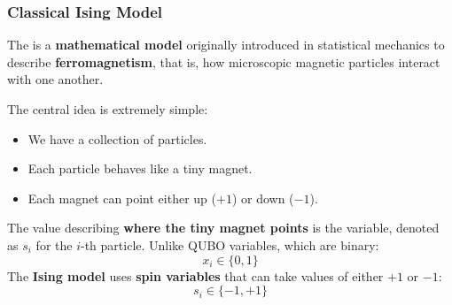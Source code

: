 \subsubsection{Classical Ising Model}\label{sec:classical-ising-model}

The  is a \textbf{mathematical model} originally introduced in statistical mechanics to describe \textbf{ferromagnetism}, that is, how microscopic magnetic particles interact with one another.

\highspace
The central idea is extremely simple:
\begin{itemize}
    \item We have a collection of particles.
    \item Each particle behaves like a tiny magnet.
    \item Each magnet can point either up ($+1$) or down ($-1$).
\end{itemize}
The value describing \textbf{where the tiny magnet points} is the  variable, denoted as $s_i$ for the $i$-th particle. Unlike QUBO variables, which are binary:
\begin{equation*}
    x_i \in \{0,1\}
\end{equation*}
The \textbf{Ising model} uses \textbf{spin variables} that can take values of either $+1$ or $-1$:
\begin{equation*}
    s_i \in \{-1, +1\}
\end{equation*}

